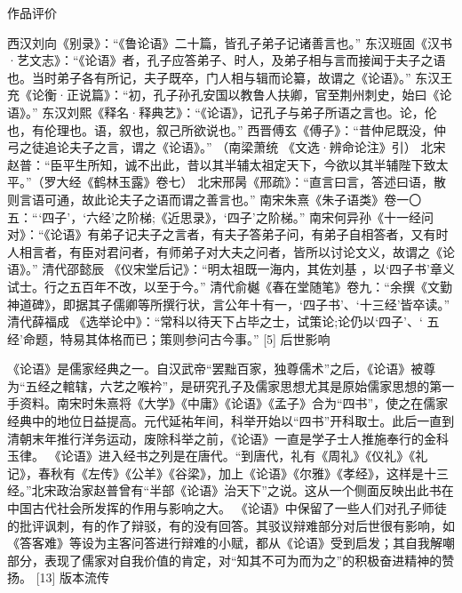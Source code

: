 \documentclass[a4paper,12pt,UTF8,twoside]{ctexbook}
\begin{document}
作品评价

西汉刘向《别录》：“《鲁论语》二十篇，皆孔子弟子记诸善言也。”
东汉班固《汉书·艺文志》：“《论语》者，孔子应答弟子、时人，及弟子相与言而接闻于夫子之语也。当时弟子各有所记，夫子既卒，门人相与辑而论纂，故谓之《论语》。”
东汉王充《论衡·正说篇》：“初，孔子孙孔安国以教鲁人扶卿，官至荆州刺史，始曰《论语》。”
东汉刘熙《释名·释典艺》：“《论语》，记孔子与弟子所语之言也。论，伦也，有伦理也。语，叙也，叙己所欲说也。”
西晋傅玄《傅子》：“昔仲尼既没，仲弓之徒追论夫子之言，谓之《论语》。” （南梁萧统 《文选·辨命论注》引）
北宋赵普：“臣平生所知，诚不出此，昔以其半辅太祖定天下，今欲以其半辅陛下致太平。”（罗大经《鹤林玉露》卷七）
北宋邢昺《邢疏》：“直言曰言，答述曰语，散则言语可通，故此论夫子之语而谓之善言也。”
南宋朱熹《朱子语类》卷一〇五：“‘四子’，‘六经’之阶梯;《近思录》，‘四子’之阶梯。”
南宋何异孙《十一经问对》：“《论语》有弟子记夫子之言者，有夫子答弟子问，有弟子自相答者，又有时人相言者，有臣对君问者，有师弟子对大夫之问者，皆所以讨论文义，故谓之《论语》。”
清代邵懿辰 《仪宋堂后记》：“明太祖既一海内，其佐刘基 ，以‘四子书’章义试士。行之五百年不改，以至于今。”
清代俞樾《春在堂随笔》卷九：“余撰《文勤神道碑》，即据其子儒卿等所撰行状，言公年十有一，‘四子书’、‘十三经’皆卒读。”
清代薛福成 《选举论中》：“常科以待天下占毕之士，试策论;论仍以‘四子’、‘ 五经’命题，特易其体格而已；策则参问古今事。” [5]
后世影响

《论语》是儒家经典之一。自汉武帝“罢黜百家，独尊儒术”之后，《论语》被尊为“五经之輨辖，六艺之喉衿”，是研究孔子及儒家思想尤其是原始儒家思想的第一手资料。南宋时朱熹将《大学》《中庸》《论语》《孟子》合为“四书”，使之在儒家经典中的地位日益提高。元代延祐年间，科举开始以“四书”开科取士。此后一直到清朝末年推行洋务运动，废除科举之前，《论语》一直是学子士人推施奉行的金科玉律。
《论语》进入经书之列是在唐代。“到唐代，礼有《周礼》《仪礼》《礼记》，春秋有《左传》《公羊》《谷梁》，加上《论语》《尔雅》《孝经》，这样是十三经。”北宋政治家赵普曾有“半部《论语》治天下”之说。这从一个侧面反映出此书在中国古代社会所发挥的作用与影响之大。
《论语》中保留了一些人们对孔子师徒的批评讽刺，有的作了辩驳，有的没有回答。其驳议辩难部分对后世很有影响，如《答客难》等设为主客问答进行辩难的小赋，都从《论语》受到启发；其自我解嘲部分，表现了儒家对自我价值的肯定，对“知其不可为而为之”的积极奋进精神的赞扬。 [13]
版本流传
\end{document}

